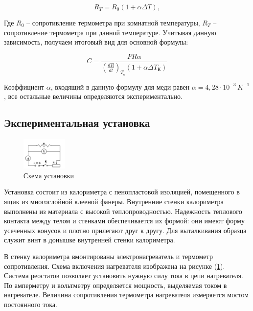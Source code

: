 \documentclass[12pt,a4paper]{article}
\begin{document}
	\begin{equation}
		R_{T} = R_{0} \left( 1 + \alpha \Delta T \right),
	\end{equation}
	
	Где $R_{0}$ -- сопротивление термометра при комнатной температуры, $R_{T}$ -- сопротивление термометра при данной температуре. Учитывая данную зависимость, получаем итоговый вид для основной формулы:
	
	\begin{equation}
		C = \frac{PR\alpha}{\left( \frac{dR}{dt} \right)_{T_{\text{к}}}\left( 1 + \alpha \Delta T_{\text{К}} \right)}
		\label{eq:capacity}
	\end{equation}	 
	
	Коэффициент $\alpha$, входящий в данную формулу для меди равен $\alpha = 4,28 \cdot 10^{-3} \, K^{-1}$, все остальные величины определяются экспериментально.



\subsection{Экспериментальная установка}

	
	\begin{figure}
		\vspace{-2.5ex}
		\begin{center}
			\includegraphics[width = 0.2\textwidth]{2.1.4_1}
			\caption{Схема установки}
			\label{fig:schem_of_facility}
		\end{center}
	\end{figure}

	Установка состоит из калориметра с пенопластовой изоляцией, помещенного в ящик из многослойной клееной фанеры. Внутренние стенки калориметра выполнены из материала с высокой теплопроводностью. Надежность теплового контакта между телом и стенками обеспечивается их формой: они имеют форму усеченных конусов и плотно прилегают друг к другу. Для выталкивания образца служит винт в донышке внутренней стенки калориметра.
	
	В стенку калориметра вмонтированы электронагреватель и термометр сопротивления. Схема включения нагревателя изображена на рисунке (\ref{fig:schem_of_facility}). Система реостатов позволяет установить нужную силу тока в цепи нагревателя. По амперметру и вольтметру определяется мощность, выделяемая током в нагревателе. Величина сопротивления термометра нагревателя  измеряется мостом постоянного тока.
	
\end{document}
